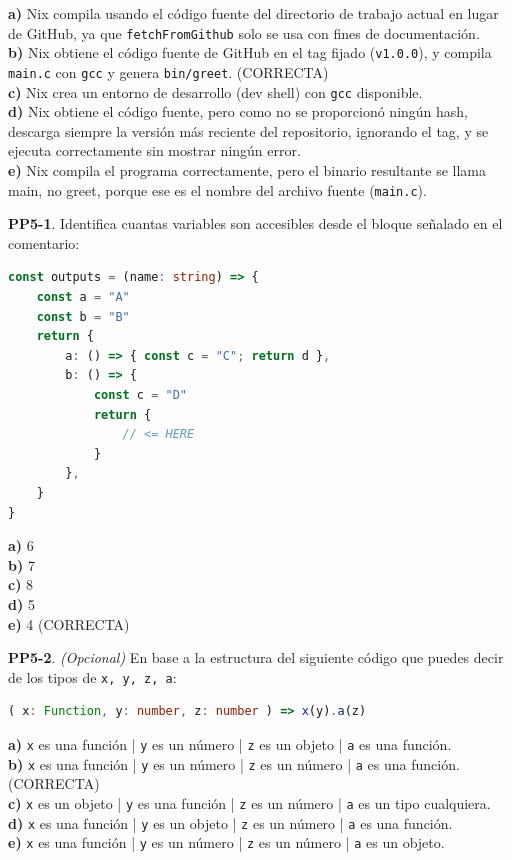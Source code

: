 \textbf{a)} Nix compila usando el código fuente del directorio de trabajo actual en lugar de GitHub, ya que \texttt{fetchFromGithub} solo se usa con fines de documentación.\\
\textbf{b)} Nix obtiene el código fuente de GitHub en el tag fijado (\texttt{v1.0.0}), y compila \texttt{main.c} con \texttt{gcc} y genera \texttt{bin/greet}. (CORRECTA)\\
\textbf{c)} Nix crea un entorno de desarrollo (dev shell) con \texttt{gcc} disponible.\\
\textbf{d)} Nix obtiene el código fuente, pero como no se proporcionó ningún hash, descarga siempre la versión más reciente del repositorio, ignorando el tag, y se ejecuta correctamente sin mostrar ningún error.\\
\textbf{e)} Nix compila el programa correctamente, pero el binario resultante se llama main, no greet, porque ese es el nombre del archivo fuente (\texttt{main.c}).

\textbf{PP5-1}. Identifica cuantas variables son accesibles desde el bloque señalado en el comentario:

\begin{bloquecodigo}
\begin{lstlisting}[language=TypeScript]
const outputs = (name: string) => {
    const a = "A"
    const b = "B"
    return {
        a: () => { const c = "C"; return d },
        b: () => {
            const c = "D"
            return {
                // <= HERE
            }
        },
    }
}
\end{lstlisting}
\end{bloquecodigo}

\textbf{a)} 6\\
\textbf{b)} 7\\
\textbf{c)} 8\\
\textbf{d)} 5\\
\textbf{e)} 4 (CORRECTA)

\textbf{PP5-2}. \emph{(Opcional)} En base a la estructura del siguiente código que puedes decir de los tipos de \texttt{x, y, z, a}:

\begin{bloquecodigo}
\begin{lstlisting}[language=TypeScript]
( x: Function, y: number, z: number ) => x(y).a(z)
\end{lstlisting}
\end{bloquecodigo}

\textbf{a)} \texttt{x} es una función | \texttt{y} es un número | \texttt{z} es un objeto | \texttt{a} es una función.\\
\textbf{b)} \texttt{x} es una función | \texttt{y} es un número | \texttt{z} es un número | \texttt{a} es una función. (CORRECTA)\\
\textbf{c)} \texttt{x} es un objeto | \texttt{y} es una función | \texttt{z} es un número | \texttt{a} es un tipo cualquiera.\\
\textbf{d)} \texttt{x} es una función | \texttt{y} es un objeto | \texttt{z} es un número | \texttt{a} es una función.\\
\textbf{e)} \texttt{x} es una función | \texttt{y} es un número | \texttt{z} es un número | \texttt{a} es un objeto.


